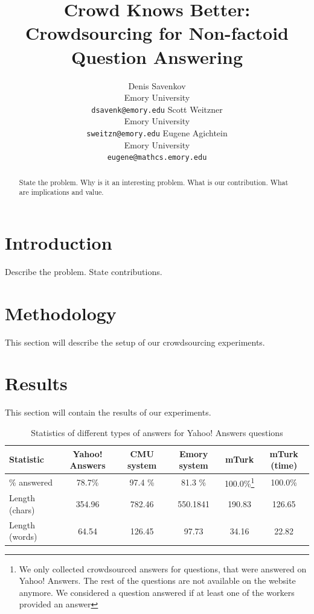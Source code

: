\documentclass[11pt,letterpaper]{article}
\title{Crowd Knows Better: Crowdsourcing for Non-factoid Question Answering}
\author{Denis Savenkov \\ Emory University \\ {\tt dsavenk@emory.edu} 
  \And Scott Weitzner \\ Emory University \\ {\tt sweitzn@emory.edu}
  \And Eugene Agichtein \\ Emory University \\ {\tt eugene@mathcs.emory.edu}
}
\date{}
\begin{document}
\maketitle

\begin{abstract}
State the problem.
Why is it an interesting problem.
What is our contribution.
What are implications and value.
\end{abstract}

\section{Introduction}
\label{sec:introduction}

Describe the problem.
State contributions.

\section{Methodology}
\label{sec:methodology}

This section will describe the setup of our crowdsourcing experiments.

\section{Results}
\label{sec:results}

This section will contain the results of our experiments.

\begin{table}[h]
\centering
\caption{Statistics of different types of answers for Yahoo! Answers questions}
\begin{tabular}{| p{2.5cm} | c | c | c | c | c |}
\hline
Statistic & Yahoo! Answers & CMU system & Emory system & mTurk & mTurk (time)\\
\hline
\% answered & 78.7\% & 97.4 \% & 81.3 \% & 100.0\%\footnote{We only collected crowdsourced answers for questions, that were answered on Yahoo! Answers. The rest of the questions are not available on the website anymore. We considered a question answered if at least one of the workers provided an answer} & 100.0\% \\
Length (chars) & 354.96 & 782.46 & 550.1841 & 190.83 & 126.65 \\
Length (words) & 64.54 & 126.45 & 97.73 & 34.16 & 22.82 \\
\hline

\hline
\end{tabular}
\label{table:answer_stats}
\end{table}
\end{document}
